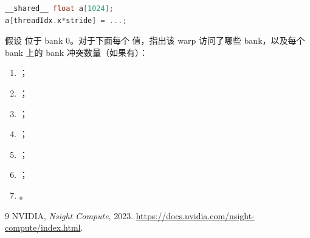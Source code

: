 \begin{enumerate}[label=\arabic*.,leftmargin=2.7em]
\begin{lstlisting}[language=C++]
__shared__ float a[1024];
a[threadIdx.x*stride] = ...;
\end{lstlisting}

  假设  位于 bank 0。对于下面每个  值，指出该 warp
  访问了哪些 bank，以及每个 bank 上的 bank 冲突数量（如果有）：
  \begin{enumerate}[label=\alph*.,leftmargin=2.2em]
    \item {}；
    \item {}；
    \item {}；
    \item {}；
    \item {}；
    \item {}；
    \item {}。
  \end{enumerate}
\end{enumerate}

\begin{chapterbibliography}{9}
  NVIDIA, \emph{Nsight Compute}, 2023.
  \url{https://docs.nvidia.com/nsight-compute/index.html}.
\end{chapterbibliography}
